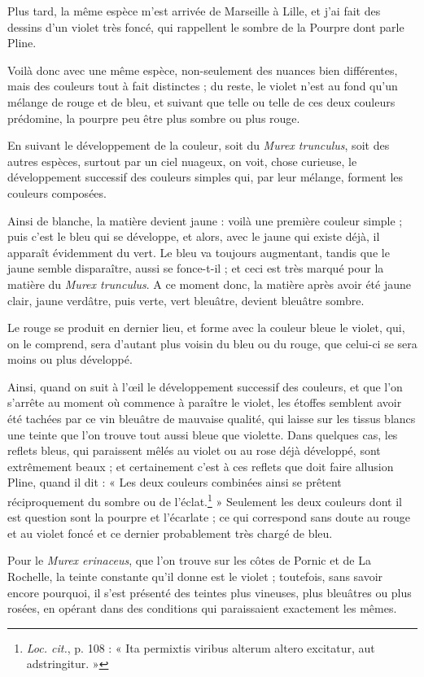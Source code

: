 \documentclass[a4paper, 11pt, oneside, polutonikogreek, french]{article}
\begin{document}
Plus tard, la même espèce m'est arrivée de Marseille à Lille, et j'ai fait des dessins d'un violet très foncé, qui rappellent le sombre de la Pourpre dont parle Pline.

Voilà donc avec une même espèce, non-seulement des nuances bien différentes, mais des couleurs tout à fait distinctes ; du reste, le violet n'est au fond qu'un mélange de rouge et de bleu, et suivant que telle ou telle de ces deux couleurs prédomine, la pourpre peu être plus sombre ou plus rouge.

En suivant le développement de la couleur, soit du \emph{Murex trunculus}, soit des autres espèces, surtout par un ciel nuageux, on voit, chose curieuse, le développement successif des couleurs simples qui, par leur mélange, forment les couleurs composées.

Ainsi de blanche, la matière devient jaune : voilà une première couleur simple ; puis c'est le bleu qui se développe, et alors, avec le jaune qui existe déjà, il apparaît évidemment du vert. Le bleu va toujours augmentant, tandis que le jaune semble disparaître, aussi se fonce-t-il ; et ceci est très marqué pour la matière du \emph{Murex trunculus}. A ce moment donc, la matière après avoir été jaune clair, jaune verdâtre, puis verte, vert bleuâtre, devient bleuâtre sombre.

Le rouge se produit en dernier lieu, et forme avec la couleur bleue le violet, qui, on le comprend, sera d'autant plus voisin du bleu ou du rouge, que celui-ci se sera moins ou plus développé.

Ainsi, quand on suit à l'œil le développement successif des couleurs, et que l'on s'arrête au moment où commence à paraître le violet, les étoffes semblent avoir été tachées par ce vin bleuâtre de mauvaise qualité, qui laisse sur les tissus blancs une teinte que l'on trouve tout aussi bleue que violette. Dans quelques cas, les reflets bleus, qui paraissent mêlés au violet ou au rose déjà développé, sont extrêmement beaux ; et certainement c'est à ces reflets que doit faire allusion Pline, quand il dit : « Les deux couleurs combinées ainsi se prêtent réciproquement du sombre ou de l'éclat.\footnote{\emph{Loc. cit.}, p. 108 : « Ita permixtis viribus alterum altero excitatur, aut adstringitur. »} » Seulement les deux couleurs dont il est question sont la pourpre et l'écarlate ; ce qui correspond sans doute au rouge et au violet foncé et ce dernier probablement très chargé de bleu.

Pour le \emph{Murex erinaceus}, que l'on trouve sur les côtes de Pornic et de La Rochelle, la teinte constante qu'il donne est le violet ; toutefois, sans savoir encore pourquoi, il s'est présenté des teintes plus vineuses, plus bleuâtres ou plus rosées, en opérant dans des conditions qui paraissaient exactement les mêmes.
\end{document}
